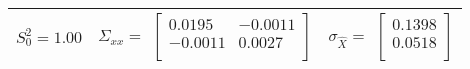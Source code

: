 \begin{table}[H]
\centering
\begin{tabular}{|c|c|c|}
\toprule
$S_0^2 = 1.00$ & %
$\Sigma_{xx} = $ $
 \begin{bmatrix}
0.0195&-0.0011\\
-0.0011&0.0027\\
\end{bmatrix}
$
& %
$\sigma_{\hat{X}} = $ $
 \begin{bmatrix}
0.1398\\
0.0518\\
\end{bmatrix}
$
\\ %
\bottomrule
\end{tabular}
\end{table}
